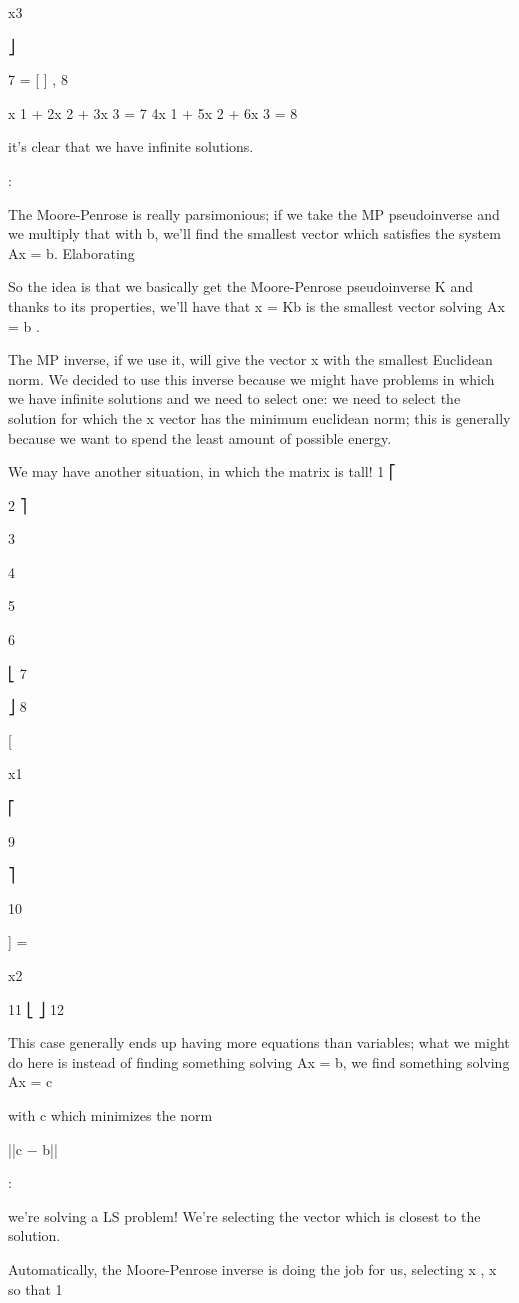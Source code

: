 {{{{{x3

⎦

7
= [ ] ,
8

x 1 + 2x 2 + 3x 3 = 7 4x 1 + 5x 2 + 6x 3 = 8

it's clear that we have infinite solutions.

:

The Moore-Penrose is really parsimonious; if we take the MP pseudoinverse and we multiply that with b, we'll find the smallest vector which satisfies the system Ax = b.
​Elaborating

So the idea is that we basically get the Moore-Penrose pseudoinverse K and thanks to its properties, we'll have that x = Kb is the smallest vector solving Ax = b .

The MP inverse, if we use it, will give the vector x with the smallest Euclidean norm.
We decided to use this inverse because we might have problems in which we have infinite solutions and we need to select one: we need to select the solution for which the x vector has the minimum euclidean norm; this is generally because we want to spend the least amount of possible energy.

We may have another situation, in which the matrix is tall!
1
⎡

2
⎤

3

4

5

6

⎣
7

⎦
8

[

x1

⎡

9

⎤

10

] =

x2

11
⎣
⎦
12

This case generally ends up having more equations than variables; what we might do here is instead of finding something solving Ax = b, we find something solving Ax = c

with c which minimizes the norm

||c − b||

:

we're solving a LS problem! We're selecting the vector which is closest to the solution.

Automatically, the Moore-Penrose inverse is doing the job for us, selecting x , x so that 1

}}}}}
